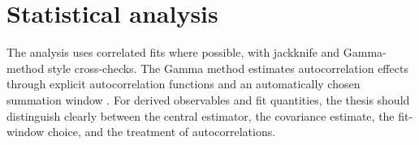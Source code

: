 \section{Statistical analysis}
The analysis uses correlated fits where possible, with jackknife and Gamma-method style cross-checks. The Gamma method estimates autocorrelation effects through explicit autocorrelation functions and an automatically chosen summation window \cite{Wolff2004}. For derived observables and fit quantities, the thesis should distinguish clearly between the central estimator, the covariance estimate, the fit-window choice, and the treatment of autocorrelations.

